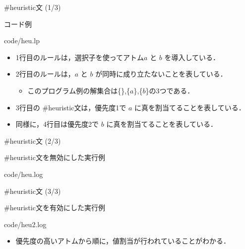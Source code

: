 \documentclass[11pt,dvipdfmx]{beamer}
\begin{document}
\begin{frame}{\textsf{\#heuristic}文 (1/3)}
\begin{exampleblock}{コード例}

{code/heu.lp}
\end{exampleblock}

\begin{itemize}
\item 1行目のルールは，選択子を使ってアトム$a$ と $b$ を導入している．
\item 2行目のルールは，$a$ と $b$ が同時に成り立たないことを表している．
 \begin{itemize}
  \item このプログラム例の解集合は\{\},\{$a$\},\{$b$\}の3つである．
 \end{itemize}
\item 3行目の \textsf{\#heuristic}文は，優先度1で $a$ に真を割当てることを表している．
\item 同様に，4行目は優先度2で $b$ に真を割当てることを表している．
\end{itemize}
\end{frame}
\begin{frame}{\textsf{\#heuristic}文 (2/3)}
\begin{exampleblock}{\textsf{\#heuristic}文を無効にした実行例}

{code/heu.log}
\end{exampleblock}

\end{frame}
\begin{frame}{\textsf{\#heuristic}文 (3/3)}
\begin{exampleblock}{\textsf{\#heuristic}文を有効にした実行例}

{code/heu2.log}
\end{exampleblock}

\begin{itemize}
\item 優先度の高いアトムから順に，値割当が行われていることがわかる．
\end{itemize}
\end{frame}
\end{document}
